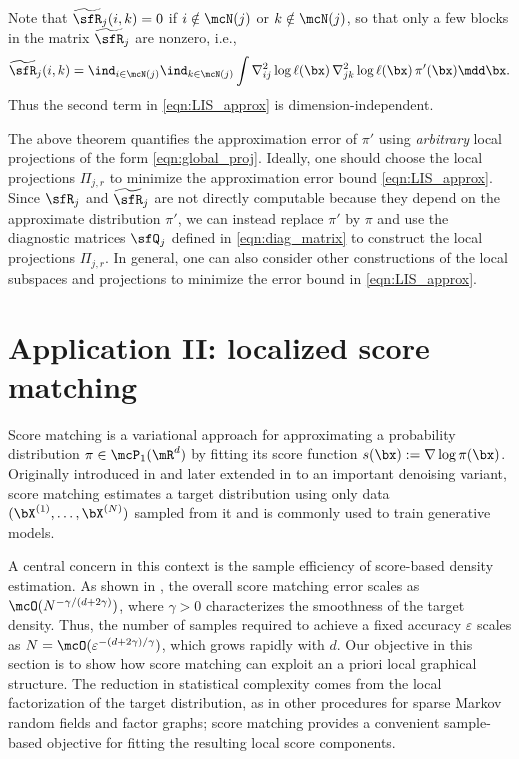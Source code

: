 \documentclass[11pt]{article}
\begin{document}
\begin{rem}
Note that $ \widetilde{\sfR}_j (i,k) = 0$ if $i\notin \mcN(j)$ or $k\notin \mcN(j)$, so that only a few blocks in the matrix $\widetilde{\sfR}_j$ are nonzero, i.e.,
\begin{equation}
    \widetilde{\sfR}_j(i,k) = \ind_{i\in \mcN(j)} \ind_{k\in \mcN(j)} \int \nabla_{ij}^2 \log \ell(\bx)\, \nabla_{jk}^2 \log \ell(\bx)\, \pi'(\bx) \mdd \bx.
\end{equation}
Thus the second term in \eqref{eqn:LIS_approx} is dimension-independent.
\end{rem}

\begin{rem}
%
The above theorem quantifies the approximation error of $\pi'$ using \emph{arbitrary} local projections of the form \eqref{eqn:global_proj}.
%
Ideally, one should choose the local projections $\Pi_{j,r}$ to minimize the approximation error bound \eqref{eqn:LIS_approx}.
Since $\sfR_j$ and $\widetilde{\sfR}_j$ are not directly computable because they depend on the approximate distribution $\pi'$, we can instead replace $\pi'$ by $\pi$ and use the diagnostic matrices $\sfQ_j$ defined in \eqref{eqn:diag_matrix} to construct the local projections $\Pi_{j,r}$.
%
In general, one can also consider other constructions of the local subspaces and projections to minimize the error bound in \eqref{eqn:LIS_approx}.
\end{rem}





\section{Application II: localized score matching}  \label{sec:LSM}

Score matching is a variational approach for approximating a probability distribution $\pi \in \mcP_{1}(\mR^d)$ by fitting its score function $s(\bx) := \nabla \log \pi(\bx)$.
Originally introduced in \cite{JMLR:v6:hyvarinen05a} and later extended in \cite{NEURIPS2019_3001ef25} to an important denoising variant, score matching estimates a target distribution using only data $(\bX^{(1)},\dots,\bX^{(N)})$ sampled from it and is commonly used to train generative models.



A central concern in this context is the sample efficiency of score-based density estimation.
As shown in \cite{pmlr-v202-oko23a,pmlr-v247-wibisono24a}, the overall score matching error scales as $\mcO(N^{-\gamma/(d+2\gamma)})$, where $\gamma > 0$ characterizes the smoothness of the target density.
Thus, the number of samples required to achieve a fixed accuracy $\varepsilon$ scales as $N = \mcO(\varepsilon^{-(d+2\gamma)/\gamma})$, which grows rapidly with $d$.
%
Our objective in this section is to show how score matching can exploit an a priori local graphical structure.
The reduction in statistical complexity comes from the local factorization of the target distribution, as in other procedures for sparse Markov random fields and factor graphs; score matching provides a convenient sample-based objective for fitting the resulting local score components.
\end{document}
